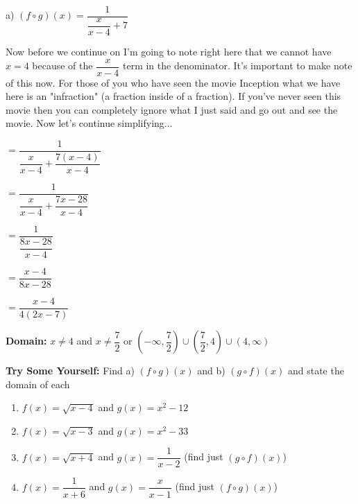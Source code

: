 \documentclass[12pt]{article}
\begin{document}
a)  $(f \circ g)(x) = \dfrac{1}{\dfrac{x}{x-4}+7}$

Now before we continue on I'm going to note right here that we cannot have $x=4$ because of the $\dfrac{x}{x-4}$ term in the denominator. It's important to make note of this now. For those of you who have seen the movie Inception what we have here is an "infraction" (a fraction inside of a fraction). If you've never seen this movie then you can completely ignore what I just said and go out and see the movie. Now let's continue simplifying...

\hspace{2.2cm} $= \dfrac{1}{\dfrac{x}{x-4}+\dfrac{7(x-4)}{x-4}}$

\hspace{2.2cm} $= \dfrac{1}{\dfrac{x}{x-4}+\dfrac{7x-28}{x-4}}$

\hspace{2.2cm} $= \dfrac{1}{\dfrac{8x-28}{x-4}}$

\hspace{2.2cm} $= \dfrac{x-4}{8x-28}$

\hspace{2.2cm} $= \dfrac{x-4}{4(2x-7)}$


\textbf{Domain:} $x \neq 4$ and $x \neq \dfrac{7}{2}$ or $(-\infty, \dfrac{7}{2}) \cup (\dfrac{7}{2},4) \cup (4, \infty)$

\textbf{Try Some Yourself:}  Find a) $(f \circ g)(x)$ and b) $(g \circ f)(x)$ and state the domain of each

\begin{enumerate}
\item $f(x) = \sqrt{x-4}$ and $g(x) = x^2-12$
\item $f(x) = \sqrt{x-3}$ and $g(x) = x^2-33$
\item $f(x) = \sqrt{x+4}$ and $g(x) = \dfrac{1}{x-2}$ (find just $(g \circ f)(x)$)
\item $f(x) = \dfrac{1}{x+6}$ and $g(x) = \dfrac{x}{x-1}$ (find just $(f \circ g)(x)$)
\end{enumerate}
\end{document}
